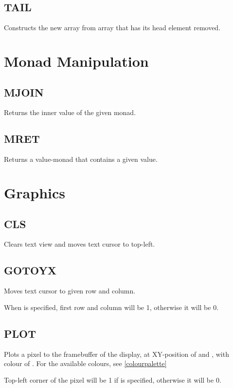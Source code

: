     \subsection{TAIL}
        \par
        Constructs the new array from array  that has its head element removed.

\section{Monad Manipulation}

    \subsection{MJOIN}
        \par
        Returns the inner value of the given monad.
    \subsection{MRET}
        \par
        Returns a value-monad that contains a given value.
        
\section{Graphics}

    \subsection{CLS}
        \par
        Clears text view and moves text cursor to top-left.
    \subsection{GOTOYX}
        \par
        Moves text cursor to given row and column.\par
        When  is specified, first row and column will be 1, otherwise it will be 0.
    \subsection{PLOT}
        \par
        Plots a pixel to the framebuffer of the display, at XY-position of  and , with colour of . For the available colours, see \ref{colourpalette}\par
        Top-left corner of the pixel will be 1 if  is specified, otherwise it will be 0.

